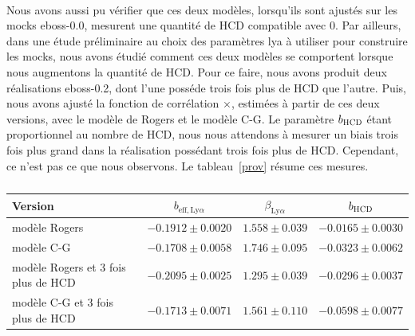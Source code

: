\documentclass[11pt, twoside, a4paper, openright]{report}
\begin{document}
\paragraph{}
Nous avons aussi pu vérifier que ces deux modèles, lorsqu'ils sont ajustés sur les mocks eboss-0.0, mesurent une quantité de HCD compatible avec 0.
Par ailleurs, dans une étude préliminaire au choix des paramètres lya{} à utiliser pour construire les mocks, nous avons étudié comment ces deux modèles se comportent lorsque nous augmentons la quantité de HCD. Pour ce faire, nous avons produit deux réalisations eboss-0.2, dont l'une posséde trois fois plus de HCD que l'autre. Puis, nous avons ajusté la fonction de corrélation \lya{}$\times$\lya{}, estimées à partir de ces deux versions, avec le modèle de Rogers et le modèle C-G. Le paramètre $b_{\textsc{HCD}} $ étant proportionnel au nombre de HCD, nous nous attendons à mesurer un biais trois fois plus grand dans la réalisation possédant trois fois plus de HCD. Cependant, ce n'est pas ce que nous observons. Le tableau~\ref{prov} résume ces mesures.


\begin{table}[]
  \centering
  \caption{}
  \label{}
  \begin{tabular}{lccc}
    \toprule
    Version  & $b_{\mathrm{eff},\mathrm{Ly}\alpha}$ & $\beta_{\mathrm{Ly}\alpha}$ & $b_{\textsc{HCD}}$  \\
    \midrule
    modèle Rogers & $-0.1912 \pm 0.0020$ & $1.558 \pm 0.039$ & $-0.0165 \pm 0.0030$ \\
    modèle C-G & $-0.1708 \pm 0.0058$ & $1.746 \pm 0.095$ & $-0.0323 \pm 0.0062$ \\
    modèle Rogers et 3 fois plus de HCD & $-0.2095 \pm 0.0025$ & $1.295 \pm 0.039$ & $-0.0296 \pm 0.0037$ \\
    modèle C-G et 3 fois plus de HCD & $-0.1713 \pm 0.0071$ & $1.561 \pm 0.110$ & $-0.0598 \pm 0.0077$ \\
    \bottomrule
\end{tabular}
\end{table}







% 
\printbibliography
\end{document}
